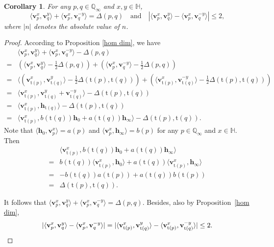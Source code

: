 \documentclass[11pt,a4paper,reqno]{amsart}%
\theoremstyle{plain}
\newtheorem{corollary}[corollary]{Corollary}
\theoremstyle{definition}
\numberwithin{equation}{section}
\numberwithin{equation}{section}
\newcommand{\QQi}{\mathbb{Q}_\infty}
\newcommand{\bv}{\mathbf{v}}
\newcommand{\typ}[1]{\mathrm{t}(#1)}%
\newcommand{\bfH}{\mathbb{H}}
\newcommand{\bfh}{\mathbf{h}}
\begin{document}
\begin{corollary}
For any $p, q\in\QQi$ and $x,y\in\bfH$,
$$\langle \bv_{p}^x, \bv_{q}^y\rangle
+\langle \bv_{p}^x, \bv_{q}^{-y}\rangle
=\Delta(p,q)\quad \text{and} \quad
|\langle \bv_{p}^x, \bv_{q}^y\rangle
-\langle \bv_{p}^x, \bv_{q}^{-y}\rangle|
\leq 2,$$
where $| n|$ denotes the absolute  value of $n$.
\end{corollary}
\begin{proof} According to Proposition \ref{hom dim}, we have
\begin{align*}&\langle \bv_{p}^x, \bv_{q}^y\rangle
+\langle \bv_{p}^x, \bv_{q}^{-y}\rangle
-\Delta(p,q)\\
=&(\langle \bv_{p}^x, \bv_{q}^y\rangle-\frac{1}{2}\Delta(p,q))
+(\langle \bv_{p}^x, \bv_{q}^{-y}\rangle
-\frac{1}{2}\Delta(p,q))\\
=&\langle (\bv_{\typ{p}}^x, \bv_{\typ{q}}^y\rangle-\frac{1}{2}\Delta(\typ{p},\typ{q}))+(\langle \bv_{\typ{p}}^x, \bv_{\typ{q}}^{-y}\rangle-\frac{1}{2}\Delta(\typ{p},\typ{q}))\\
=&\langle \bv_{\typ{p}}^x, \bv_{\typ{q}}^y+\bv_{\typ{q}}^{-y}\rangle-\Delta(\typ{p},\typ{q})\\
=&\langle \bv_{\typ{p}}^x, \bfh_{\typ{q}}\rangle-\Delta(\typ{p},\typ{q})\\
=&\langle \bv_{\typ{p}}^x, b(\typ{q})\bfh_{0}+a(\typ{q})\bfh_{\infty}\rangle-\Delta(\typ{p},\typ{q}). 
\end{align*} 
Note that $\langle \bfh_{0},  \bv_{p}^x\rangle=a(p)$ and $\langle \bv_{p}^x, \bfh_{\infty}\rangle=b(p)$ for any $p\in\QQi$ and $x\in\bfH$. Then
\begin{align*}&\langle \bv_{\typ{p}}^x, b(\typ{q})\bfh_{0}+a(\typ{q})\bfh_{\infty}\rangle\\
 =&b(\typ{q})\langle \bv_{\typ{p}}^x, \bfh_{0}\rangle
+a(\typ{q})\langle \bv_{\typ{p}}^x, \bfh_{\infty}\rangle\\
 =&-b(\typ{q})a(\typ{p})+a(\typ{q})b(\typ{p})\\
 =&\Delta(\typ{p},\typ{q}).
\end{align*}

It follows that $\langle \bv_{p}^x, \bv_{q}^y\rangle
+\langle \bv_{p}^x, \bv_{q}^{-y}\rangle
=\Delta(p,q)$.
Besides, also by Proposition~\ref{hom dim},
\[
|\langle \bv_{p}^x, \bv_{q}^y\rangle
-\langle \bv_{p}^x, \bv_{q}^{-y}\rangle|
=|\langle \bv_{\typ{p}}^x, \bv_{\typ{q}}^y\rangle
-\langle \bv_{\typ{p}}^x, \bv_{\typ{q}}^{-y}\rangle|
\leq 2. 
\qedhere
\]
\end{proof}
\end{document}
